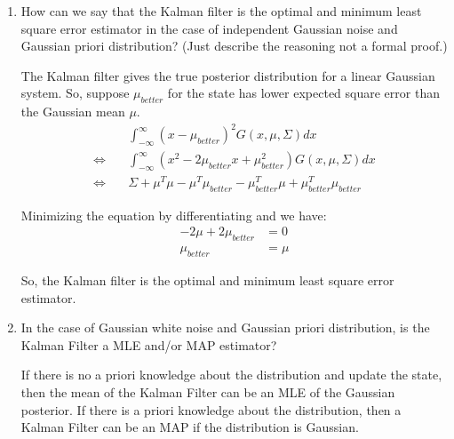 \documentclass[11pt,a4paper]{article}
\begin{document}
\begin{enumerate}
	\item \addtocounter{cnt_questions}{1} How can we say that the Kalman filter is the optimal and minimum least square error  estimator in the case of independent Gaussian noise and Gaussian priori distribution? (Just describe the reasoning not a formal proof.)
		\par The Kalman filter gives the true posterior distribution for a linear Gaussian system. So, suppose $\mu_{better}$ for the state has lower expected square error than the Gaussian mean $\mu$.
		\begin{align}
			& \int_{-\infty}^{\infty}(x - \mu_{better})^{2} G(x, \mu, \Sigma)dx \\
			\Leftrightarrow \quad & \int_{-\infty}^{\infty}(x^{2} - 2\mu_{better}x + \mu_{better}^{2}) G(x, \mu, \Sigma)dx \\
			\Leftrightarrow \quad & \Sigma + \mu^{T}\mu - \mu^{T}\mu_{better} - \mu_{better}^{T}\mu + \mu_{better}^{T}\mu_{better}
		\end{align}
		\par Minimizing the equation by differentiating and we have:
		\begin{align}
			-2\mu + 2\mu_{better} &= 0 \\
			\mu_{better} &= \mu
		\end{align}
		\par So, the Kalman filter is the optimal and minimum least square error estimator.

	\item \addtocounter{cnt_questions}{1} In the case of Gaussian white noise and Gaussian priori distribution, is the Kalman Filter a MLE and/or MAP estimator?
		\par If there is no a priori knowledge about the distribution and update the state, then the mean of the Kalman Filter can be an MLE of the Gaussian posterior. If there is a priori knowledge about the distribution, then a Kalman Filter can be an MAP if the distribution is Gaussian.
\end{enumerate}
\end{document}
